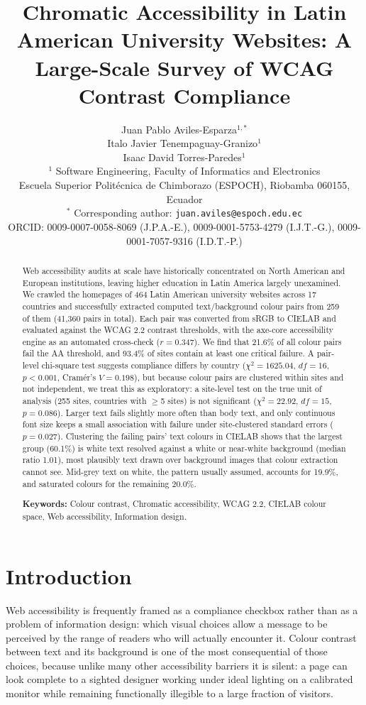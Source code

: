 \documentclass[10pt]{article}
\title{Chromatic Accessibility in Latin American University Websites: A Large-Scale Survey of WCAG Contrast Compliance}
\author{
  Juan Pablo Aviles-Esparza$^{1,*}$ \\[0.4ex]
  Italo Javier Tenempaguay-Granizo$^{1}$ \\[0.4ex]
  Isaac David Torres-Paredes$^{1}$ \\[1.8ex]
  \small $^{1}$ Software Engineering, Faculty of Informatics and Electronics \\
  \small Escuela Superior Politécnica de Chimborazo (ESPOCH), Riobamba 060155, Ecuador \\[1ex]
  \small $^{*}$ Corresponding author: \texttt{juan.aviles@espoch.edu.ec} \\[0.6ex]
  \footnotesize ORCID: 0009-0007-0058-8069 (J.P.A.-E.), 0009-0001-5753-4279 (I.J.T.-G.), 0009-0001-7057-9316 (I.D.T.-P.)
}
\date{}
\begin{document}
\sloppy
\maketitle

\begin{abstract}
Web accessibility audits at scale have historically concentrated on North American and European institutions, leaving higher education in Latin America largely unexamined. We crawled the homepages of 464 Latin American university websites across 17 countries and successfully extracted computed text/background colour pairs from 259 of them (41,360 pairs in total). Each pair was converted from sRGB to CIELAB and evaluated against the WCAG 2.2 contrast thresholds, with the axe-core accessibility engine as an automated cross-check ($r=0.347$). We find that 21.6\% of all colour pairs fail the AA threshold, and 93.4\% of sites contain at least one critical failure. A pair-level chi-square test suggests compliance differs by country ($\chi^2=1625.04$, $df=16$, $p<0.001$, Cram\'{e}r's $V=0.198$), but because colour pairs are clustered within sites and not independent, we treat this as exploratory: a site-level test on the true unit of analysis (255 sites, countries with $\geq$5 sites) is not significant ($\chi^2=22.92$, $df=15$, $p=0.086$). Larger text fails slightly more often than body text, and only continuous font size keeps a small association with failure under site-clustered standard errors ($p=0.027$). Clustering the failing pairs' text colours in CIELAB shows that the largest group (60.1\%) is white text resolved against a white or near-white background (median ratio 1.01), most plausibly text drawn over background images that colour extraction cannot see. Mid-grey text on white, the pattern usually assumed, accounts for 19.9\%, and saturated colours for the remaining 20.0\%.

\vspace{0.8em}
{\sloppy\noindent\textbf{Keywords:} Colour contrast, Chromatic accessibility, WCAG 2.2, CIELAB colour space, Web accessibility, Information design.\par}
\end{abstract}

\section{Introduction}

Web accessibility is frequently framed as a compliance checkbox rather than as a problem of information design: which visual choices allow a message to be perceived by the range of readers who will actually encounter it. Colour contrast between text and its background is one of the most consequential of those choices, because unlike many other accessibility barriers it is silent: a page can look complete to a sighted designer working under ideal lighting on a calibrated monitor while remaining functionally illegible to a large fraction of visitors.
\end{document}
